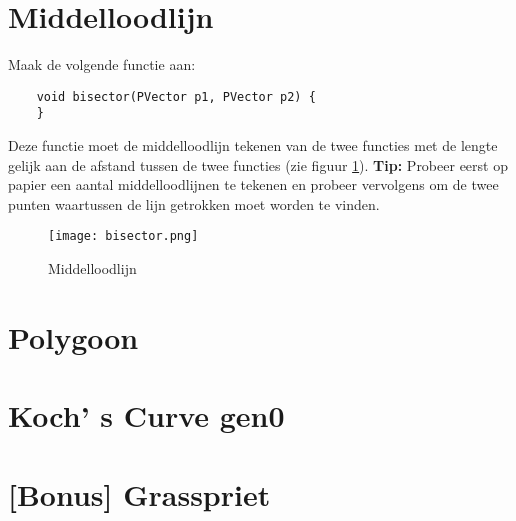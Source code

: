 \newpage
\section{Middelloodlijn}
Maak de volgende functie aan:
\begin{lstlisting}
	void bisector(PVector p1, PVector p2) {
	}
\end{lstlisting}
Deze functie moet de middelloodlijn tekenen van de twee functies met de lengte gelijk aan de afstand tussen de twee functies (zie figuur \ref{fig:bisector}). \textbf{Tip:} Probeer eerst op papier een aantal middelloodlijnen te tekenen en probeer vervolgens om de twee punten waartussen de lijn getrokken moet worden te vinden.
\begin{figure}[h!]
	\texttt{[image: bisector.png]}
	\label{fig:bisector}
	\caption{Middelloodlijn}
\end{figure}


\section{Polygoon}
\section{Koch' s Curve gen0}
\section{[Bonus] Grasspriet}


